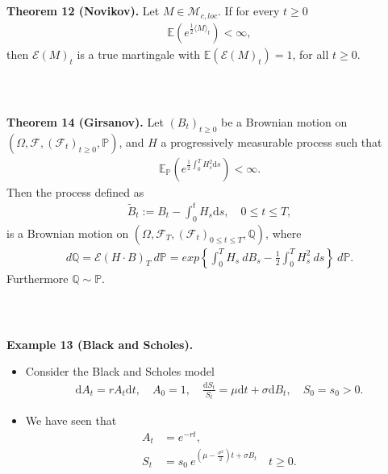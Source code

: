 \documentclass{beamer}
\numberwithin{equation}{section}
\newenvironment{frame2}{\begin{frame}\frametitle{{\normalsize \secname} \\ {\large \subsecname}}}{\end{frame}}
\begin{document}
\begin{frame2}
    \textbf{Theorem 12 (Novikov).}
    Let $M\in\mathcal{M}_{c, loc}$.
    If for every $t\geq 0$
    \begin{align*}
        \mathbb{E}(e^{\frac{1}{2}\langle M\rangle_t})<\infty,
    \end{align*}
    then $\mathcal{E}(M)_t$ is a true martingale with $\mathbb{E}(\mathcal{E}(M)_t)=1$, for all $t\geq 0$.
\end{frame2}

\begin{frame2}
    \textbf{Theorem 14 (Girsanov).}
    Let $(B_t)_{t\geq 0}$ be a Brownian motion on $(\Omega, \mathscr{F}, (\mathscr{F}_t)_{t\geq 0}, \mathbb{P})$, and $H$ a progressively measurable process such that 
    \begin{align*}
        \mathbb{E}_{\mathbb{P}}(e^{\frac{1}{2}\int_0^T H_s^2 \text{d}s})<\infty.
    \end{align*}
    Then the process defined as
    \begin{align*}
        \tilde{B}_t:=B_t-\int_0^t H_s \text{d}s, \quad 0\leq t\leq T,
    \end{align*}
    is a Brownian motion on $(\Omega, \mathscr{F}_T, (\mathscr{F}_t)_{0\leq t\leq T}, \mathbb{Q})$, where
    \begin{align*}
        d\mathbb{Q}=\mathcal{E}(H\cdot B)_T \ d \mathbb{P} = exp\left\{\int_0^T H_s \ d B_s - \frac{1}{2} \int_0^T H_s^2 \ ds\right\} \ d \mathbb{P}.
    \end{align*}
    Furthermore $\mathbb{Q} \sim \mathbb{P}$.
\end{frame2}

\begin{frame2}
    \textbf{Example 13 (Black and Scholes).}
    \begin{itemize}
        \item Consider the Black and Scholes model
        \begin{align*}
            \text{d}A_t=rA_t\text{d}t, \quad A_0=1, \quad \frac{\text{d}S_t}{S_t}=\mu \text{d}t+\sigma \text{d} B_t, \quad S_0=s_0>0.
        \end{align*}
        \item We have seen that
        \begin{align*}
            A_t&=e^{-rt},\\
            S_t&=s_0 \ e^{(\mu-\frac{\sigma^2}{2})t+\sigma B_t} \quad t \geq 0.
        \end{align*}
    \end{itemize}
\end{frame2}
\end{document}
